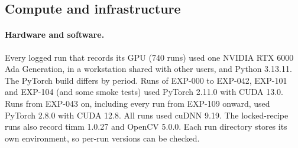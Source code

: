 \subsection{Compute and infrastructure}\label{app:compute}

\paragraph{Hardware and software.}
Every logged run that records its GPU (740 runs) used one NVIDIA RTX 6000 Ada Generation, in a workstation shared with other users, and Python 3.13.11. The PyTorch build differs by period. Runs of EXP-000 to EXP-042, EXP-101 and EXP-104 (and some smoke tests) used PyTorch 2.11.0 with CUDA 13.0. Runs from EXP-043 on, including every run from EXP-109 onward, used PyTorch 2.8.0 with CUDA 12.8. All runs used cuDNN 9.19. The locked-recipe runs also record timm 1.0.27 and OpenCV 5.0.0. Each run directory stores its own environment, so per-run versions can be checked.

